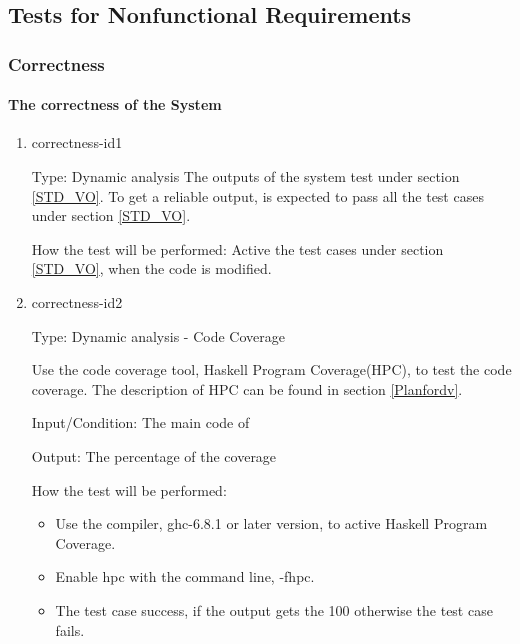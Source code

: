 \documentclass[12pt, titlepage]{article}
\begin{document}
\subsection{Tests for Nonfunctional Requirements}

  \subsubsection{Correctness}
\paragraph{The correctness of the System}

\begin{enumerate} 

\item{correctness-id1\\} 

Type: Dynamic analysis
The outputs of the system test under section \ref{STD_VO}. To get a
reliable output, \progname is expected to pass all the test cases under section \ref{STD_VO}.

How the test will be performed: Active the test cases under section
\ref{STD_VO}, when the code is modified.

\item{correctness-id2\\}

Type: Dynamic analysis - Code Coverage

Use the code coverage tool, Haskell Program Coverage(HPC), to test the code
coverage. The description of HPC can be found in section \ref{Planfordv}.

Input/Condition: The main code of \progname

Output: The percentage of the coverage 

How the test will be performed:

\begin{itemize} 
\item Use the compiler, ghc-6.8.1 or later version, to active Haskell Program
Coverage.
\item Enable hpc with the command line, -fhpc.
\item The test case success, if the output gets the 100%
otherwise
the test case fails. 
\end{itemize}
\end{enumerate} 
\end{document}
